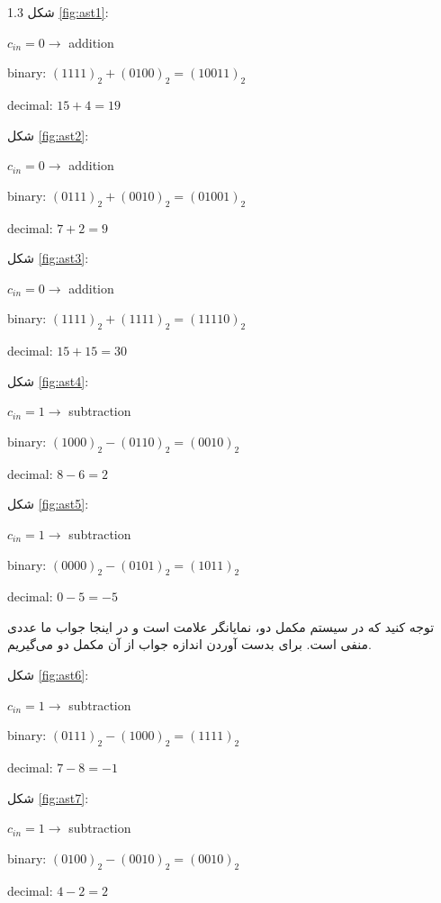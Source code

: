 \documentclass[a4paper,12pt]{article}
\numberwithin{figure}{subsection}
\begin{document}
\begin{spacing}{1.3}
شکل \ref{fig:ast1}:

\begin{latin}
$c_{in} = 0 \to$ addition

binary: $(1111)_2 + (0100)_2 = (10011)_2$

decimal: $15 + 4 = 19$
\end{latin}

شکل \ref{fig:ast2}:

\begin{latin}
$c_{in} = 0 \to$ addition

binary: $(0111)_2 + (0010)_2 = (01001)_2$

decimal: $7 + 2 = 9$
\end{latin}

شکل \ref{fig:ast3}:

\begin{latin}
$c_{in} = 0 \to$ addition

binary: $(1111)_2 + (1111)_2 = (11110)_2$

decimal: $15 + 15 = 30$
\end{latin}

شکل \ref{fig:ast4}:

\begin{latin}
$c_{in} = 1 \to$ subtraction

binary: $(1000)_2 - (0110)_2 = (0010)_2$

decimal: $8 - 6 = 2$
\end{latin}

شکل \ref{fig:ast5}:

\begin{latin}
$c_{in} = 1 \to$ subtraction

binary: $(0000)_2 - (0101)_2 = (1011)_2$

decimal: $0 - 5 = -5$
\end{latin}

توجه کنید که در سیستم مکمل دو،  نمایانگر علامت است و در اینجا جواب ما عددی منفی است. برای بدست آوردن اندازه جواب از آن مکمل دو می‌گیریم.

شکل \ref{fig:ast6}:

\begin{latin}
$c_{in} = 1 \to$ subtraction

binary: $(0111)_2 - (1000)_2 = (1111)_2$

decimal: $7 - 8 = -1$
\end{latin}

شکل \ref{fig:ast7}:

\begin{latin}
$c_{in} = 1 \to$ subtraction

binary: $(0100)_2 - (0010)_2 = (0010)_2$

decimal: $4 - 2 = 2$
\end{latin}


\end{spacing}
\end{document}
